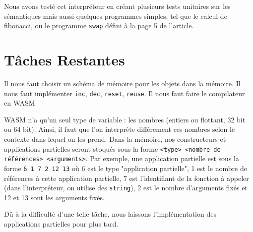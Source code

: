 \documentclass{rapportECL}
\begin{document}
Nous avons testé cet interpréteur en créant plusieurs tests unitaires sur les sémantiques mais aussi quelques programmes simples, 
tel que le calcul de fibonacci, ou le programme \verb|swap| défini à la page 5 de l'article\cite{ullrich_counting_2020}.

\section{Tâches Restantes}

Il nous faut choisir un schéma de mémoire pour les objets dans la mémoire.
Il nous faut implémenter \verb|inc|, \verb|dec|, \verb|reset|, \verb|reuse|.
Il nous faut faire le compilateur en WASM

WASM n'a qu'un seul type de variable : les nombres (entiers ou flottant, 32 bit ou 64 bit). 
Ainsi, il faut que l'on interprète différement ces nombres selon le contexte dans lequel on les prend. 
Dans la mémoire, nos constructeurs et applications partielles seront stoqués sous la forme \verb|<type> <nombre de références> <arguments>|. 
Par exemple, une application partielle est sous la forme \verb|6 1 7 2 12 13| où 6 est le type "application partielle", 
1 est le nombre de références à cette application partielle, 
7 est l'identifiant de la fonction à appeler (dans l'interpréteur, on utilise des \verb|string|), 
2 est le nombre d'arguments fixés et 12 et 13 sont les arguments fixés.

Dû à la difficulté d'une telle tâche, nous laissons l'implémentation des applications partielles pour plus tard.

\printbibliography
\end{document}
